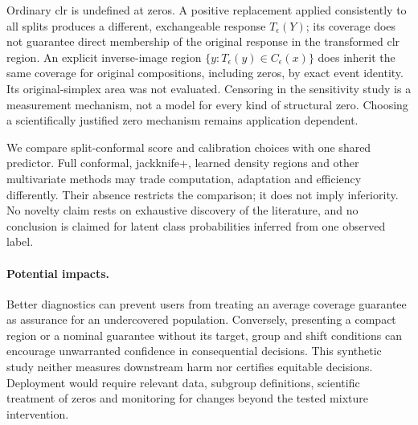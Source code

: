 Ordinary clr is undefined at zeros. A positive replacement applied consistently to all splits produces a different, exchangeable response $T_\epsilon(Y)$; its coverage does not guarantee direct membership of the original response in the transformed clr region. An explicit inverse-image region $\{y:T_\epsilon(y)\in C_\epsilon(x)\}$ does inherit the same coverage for original compositions, including zeros, by exact event identity. Its original-simplex area was not evaluated. Censoring in the sensitivity study is a measurement mechanism, not a model for every kind of structural zero. Choosing a scientifically justified zero mechanism remains application dependent.

We compare split-conformal score and calibration choices with one shared predictor. Full conformal, jackknife+, learned density regions and other multivariate methods may trade computation, adaptation and efficiency differently. Their absence restricts the comparison; it does not imply inferiority. No novelty claim rests on exhaustive discovery of the literature, and no conclusion is claimed for latent class probabilities inferred from one observed label.

\paragraph{Potential impacts.}
Better diagnostics can prevent users from treating an average coverage guarantee as assurance for an undercovered population. Conversely, presenting a compact region or a nominal guarantee without its target, group and shift conditions can encourage unwarranted confidence in consequential decisions. This synthetic study neither measures downstream harm nor certifies equitable decisions. Deployment would require relevant data, subgroup definitions, scientific treatment of zeros and monitoring for changes beyond the tested mixture intervention.
